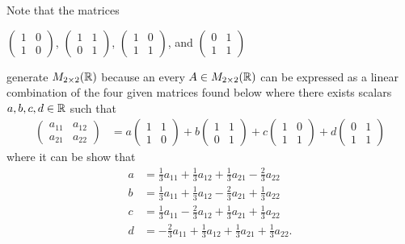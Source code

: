 \begin{eg}[Matrices]
    Note that the matrices
    \begin{center}
        \( \begin{pmatrix}
            1 & 0 \\
            1 & 0 
        \end{pmatrix} \),  \( \begin{pmatrix}
            1 & 1 \\ 
            0 & 1 
        \end{pmatrix} \),  \( \begin{pmatrix}
            1 & 0 \\ 
            1 & 1 
        \end{pmatrix} \), and \( \begin{pmatrix}
            0 & 1 \\
            1 & 1 
        \end{pmatrix} \) 
        
    \end{center}
    generate \( M_{2 \times 2 }(\mathbb{R} ) \) because an every \( A \in M_{2 \times 2}(\mathbb{R})  \) can be expressed as a linear combination of the four given matrices found below where there exists scalars \( a, b , c , d \in \mathbb{R}  \) such that
    \begin{align*}
        \begin{pmatrix}
            a_{11} & a_{12} \\
            a_{21} & a_{22} 
        \end{pmatrix} &= a  \begin{pmatrix}
        1 & 1 \\
        1 & 0 
        \end{pmatrix} 
        + b \begin{pmatrix}
            1 &  1 \\
            0 & 1 
        \end{pmatrix} + c \begin{pmatrix}
            1 & 0 \\
            1 & 1 
        \end{pmatrix} 
        + d \begin{pmatrix}
            0 & 1 \\
            1 & 1 
        \end{pmatrix}
    \end{align*}
    where it can be show that 
    \begin{align*}
        a &= \frac{ 1 }{ 3 }  a_{11} + \frac{ 1 }{ 3 }  a_{12} + \frac{ 1 }{ 3 }  a_{21} - \frac{ 2 }{ 3 }  a_{22}   \\
        b &= \frac{ 1 }{ 3 }  a_{11} + \frac{ 1 }{ 3 }  a_{12} - \frac{ 2 }{ 3 }  a_{21} + \frac{ 1 }{ 3 }  a_{22} \\
        c &= \frac{ 1 }{ 3 }  a_{11} - \frac{ 2 }{ 3 }  a_{12} + \frac{ 1 }{ 3 }  a_{21} + \frac{ 1 }{ 3 }  a_{22} \\
        d &= - \frac{ 2 }{ 3 }  a_{11} + \frac{ 1 }{ 3 }  a_{12} + \frac{ 1 }{ 3 }  a_{21} + \frac{ 1 }{ 3 }  a_{22}.
    \end{align*}


\end{eg}
